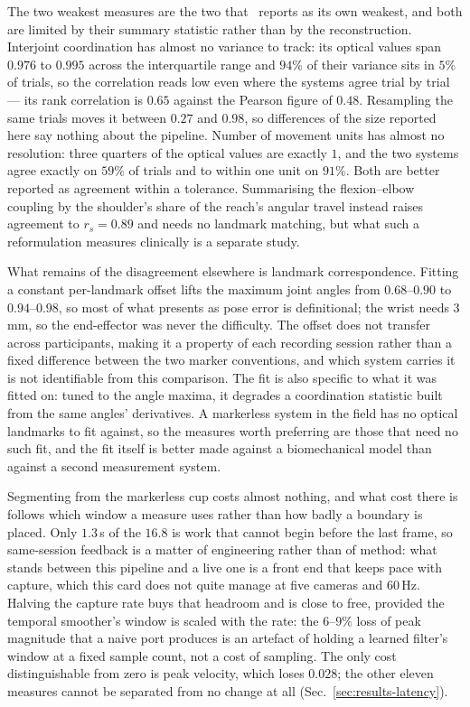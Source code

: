 \documentclass[conference]{IEEEtran}
\begin{document}
The two weakest measures are the two that~\cite{unger2024} reports as its own
weakest, and both are limited by their summary statistic rather than by the
reconstruction. Interjoint coordination has almost no variance to track: its
optical values span $0.976$ to $0.995$ across the interquartile range and $94\%$
of their variance sits in $5\%$ of trials, so the correlation reads low even
where the systems agree trial by trial --- its rank correlation is $0.65$ against
the Pearson figure of $0.48$. Resampling the same trials moves it between $0.27$
and $0.98$, so differences of the size reported here say nothing about the
pipeline. Number of movement units has almost no resolution:
three quarters of the optical values are exactly $1$, and the two systems agree
exactly on $59\%$ of trials and to within one unit on $91\%$. Both are better reported as
agreement within a tolerance. Summarising the flexion--elbow coupling by the
shoulder's share of the reach's angular travel instead raises agreement to
$r_s = 0.89$ and needs no landmark matching, but what such a reformulation
measures clinically is a separate study.

What remains of the disagreement elsewhere is landmark correspondence. Fitting a
constant per-landmark offset lifts the maximum joint angles from $0.68$--$0.90$
to $0.94$--$0.98$, so most of what presents as pose error is definitional; the
wrist needs $3$\,mm, so the end-effector was never the difficulty. The offset
does not transfer across participants, making it a property of each recording
session rather than a fixed difference between the two marker conventions, and
which system carries it is not identifiable from this comparison. The fit is
also specific to what it was fitted on: tuned to the angle maxima, it degrades a
coordination statistic built from the same angles' derivatives. A markerless
system in the field has no optical landmarks to fit against, so the measures
worth preferring are those that need no such fit, and the fit itself is better
made against a biomechanical model than against a second measurement system.

Segmenting from the markerless cup costs almost nothing, and what cost there is
follows which window a measure uses rather than how badly a boundary is placed.
Only $1.3$\,s of the $16.8$ is work that cannot begin before the
last frame, so same-session feedback is a matter of engineering rather than of
method: what stands between this pipeline and a live one is a front end that
keeps pace with capture, which this card does not quite manage at five cameras
and $60$\,Hz. Halving the capture rate buys that headroom and is close to free, provided the
temporal smoother's window is scaled with the rate: the $6$--$9\%$ loss of peak
magnitude that a naive port produces is an artefact of holding a learned filter's
window at a fixed sample count, not a cost of sampling. The only cost distinguishable from
zero is peak velocity, which loses $0.028$; the other eleven measures cannot be
separated from no change at all (Sec.~\ref{sec:results-latency}).
\end{document}
